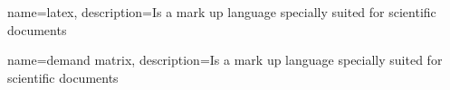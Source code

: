 {
        name=latex,
        description={Is a mark up language specially suited for 
scientific documents}
}

{
	name=demand matrix,
	description={Is a mark up language specially suited for 
		scientific documents}
}
